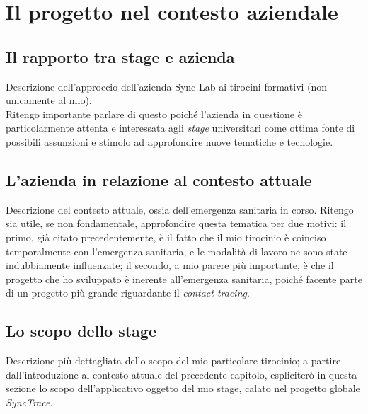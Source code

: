 
\chapter{Il progetto nel contesto aziendale}
\label{cap:progetto-contesto-aziendale}

\section{Il rapporto tra stage e azienda}

Descrizione dell'approccio dell'azienda Sync Lab ai tirocini formativi (non unicamente al mio). \\
Ritengo importante parlare di questo poiché l'azienda in questione è particolarmente attenta e interessata agli \textit{stage} universitari come ottima fonte di possibili assunzioni e stimolo ad approfondire nuove tematiche e tecnologie.


\section{L'azienda in relazione al contesto attuale}

Descrizione del contesto attuale, ossia dell'emergenza sanitaria in corso. Ritengo sia utile, se non fondamentale, approfondire questa tematica per due motivi: il primo, già citato precedentemente, è il fatto che il mio tirocinio è coinciso temporalmente con l'emergenza sanitaria, e le modalità di lavoro ne sono state indubbiamente influenzate; il secondo, a mio parere più importante, è che il progetto che ho sviluppato è inerente all'emergenza sanitaria, poiché facente parte di un progetto più grande riguardante il \textit{contact tracing}.


\section{Lo scopo dello stage}

Descrizione più dettagliata dello scopo del mio particolare tirocinio; a partire dall'introduzione al contesto attuale del precedente capitolo, espliciterò in questa sezione lo scopo dell'applicativo oggetto del mio stage, calato nel progetto globale \textit{SyncTrace}.

